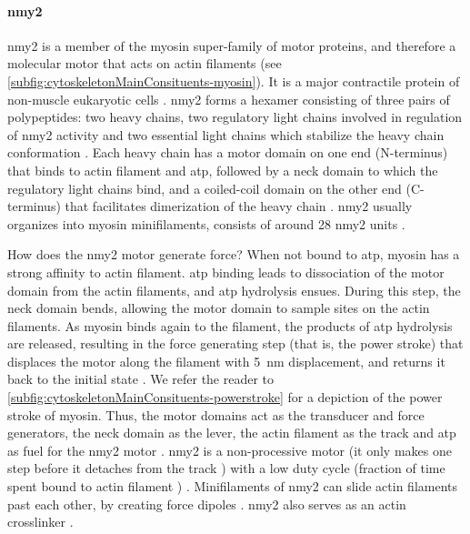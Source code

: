 \paragraph{\acl{nmy2}}
\ac{nmy2} is a member of the myosin super-family of motor proteins, and therefore a molecular motor that acts on actin filaments (see \autoref{subfig:cytoskeletonMainConsituents-myosin}). It is a major contractile protein of non-muscle eukaryotic cells \citep{chaffey2003alberts,holmes2008myosin}. \ac{nmy2} forms a hexamer consisting of three pairs of polypeptides: two heavy chains, two regulatory light chains involved in regulation of \ac{nmy2} activity and two essential light chains which stabilize the heavy chain conformation \citep{holmes2008myosin,vicente2009non}. Each heavy chain has a motor domain on one end (N-terminus) that binds to actin filament and \ac{atp}, followed by a neck domain to which the regulatory light chains bind, and a coiled-coil domain on the other end (C-terminus) that facilitates dimerization of the heavy chain \citep{holmes2008myosin,vicente2009non,robert2019force}. \ac{nmy2} usually organizes into myosin minifilaments, consists of around \num{28} \ac{nmy2} units \citep{holmes2008myosin,vicente2009non}. 

How does the \ac{nmy2} motor generate force? When not bound to \ac{atp}, myosin has a strong affinity to actin filament. \ac{atp} binding leads to dissociation of the motor domain from the actin filaments, and \ac{atp} hydrolysis ensues. During this step, the neck domain bends, allowing the motor domain to sample sites on the actin filaments. As myosin binds again to the filament, the products of \ac{atp} hydrolysis are released, resulting in the force generating step (that is, the power stroke) that displaces the motor along the filament with \SI{5}{\nano\meter} displacement, and returns it back to the initial state \citep{de2004relating,sweeney2010structural,tyska2002myosin,robert2019force}. We refer the reader to \autoref{subfig:cytoskeletonMainConsituents-powerstroke} for a depiction of the power stroke of myosin. Thus, the motor domains act as the transducer and force generators, the neck domain as the lever, the actin filament as the track and \ac{atp} as fuel for the \ac{nmy2} motor \citep{robert2019force,hwang2009mechanical}. \ac{nmy2} is a non-processive motor (it only makes one step before it detaches from the track \citep{howard2002mechanics,hwang2009mechanical}) with a low duty cycle (fraction of time spent bound to actin filament \citep{howard2002mechanics,hwang2009mechanical}) \citep{kovacs2003functional,wang2003kinetic}. Minifilaments of \ac{nmy2} can slide actin filaments past each other, by creating force dipoles \citep{vicente2009non,niederman1975human,mahajan1996assembly}. \ac{nmy2} also serves as an actin crosslinker \citep{xu2001during,mizuno2007nonequilibrium,laevsky2003cross}.

